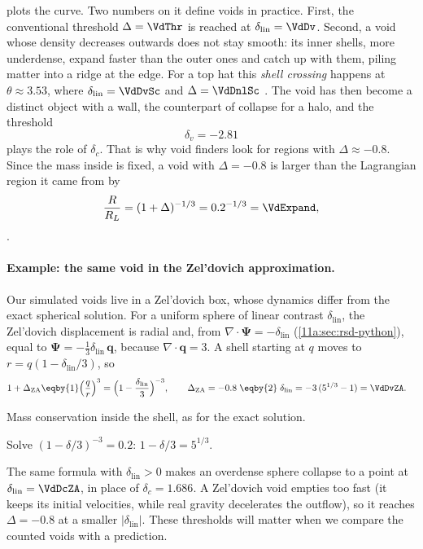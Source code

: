  plots the curve. Two numbers on it define voids in
practice. First, the conventional threshold $\Delta=\VdThr$ is reached at
$\delta_{\mathrm{lin}}=\VdDv$. Second, a void whose density decreases outwards does
not stay smooth: its inner shells, more underdense, expand faster than the outer
ones and catch up with them, piling matter into a ridge at the edge. For a top hat
this \emph{shell crossing} happens at $\theta\approx3.53$, where
$\delta_{\mathrm{lin}}=\VdDvSc$ and $\Delta=\VdDnlSc$
. The void has then become a distinct object
with a wall, the counterpart of collapse for a halo, and the threshold
\begin{equation}
  \delta_v=-2.81
  \label{11b:eq:deltav}
\end{equation}
plays the role of $\delta_c$. That is why void finders look for regions with
$\Delta\approx-0.8$. Since the mass inside is fixed, a void with $\Delta=-0.8$ is
larger than the Lagrangian region it came from by
\begin{equation}
  \frac{R}{R_L}=(1+\Delta)^{-1/3}=0.2^{-1/3}=\VdExpand ,
  \label{11b:eq:void-expand}
\end{equation}
.

\paragraph{Example: the same void in the Zel'dovich approximation.}
Our simulated voids live in a Zel'dovich box, whose dynamics differ from the exact
spherical solution. For a uniform sphere of linear contrast $\delta_{\mathrm{lin}}$,
the Zel'dovich displacement is radial and, from $\nabla\cdot\bm\Psi=-\delta_{\mathrm{lin}}$
(\cref{11a:sec:rsd-python}), equal to $\bm\Psi=-\tfrac13\delta_{\mathrm{lin}}\,\bm q$,
because $\nabla\cdot\bm q=3$. A shell starting at $q$ moves to
$r=q(1-\delta_{\mathrm{lin}}/3)$, so
\begin{align}
  1+\Delta_{\mathrm{ZA}}
  &\eqby{1}\Bigl(\frac qr\Bigr)^3
   =\Bigl(1-\frac{\delta_{\mathrm{lin}}}{3}\Bigr)^{-3},
  \qquad
  \Delta_{\mathrm{ZA}}=-0.8
  \;\eqby{2}\;\delta_{\mathrm{lin}}=-3\,(5^{1/3}-1)=\VdDvZA .
  \label{11b:eq:za-void}
\end{align}
\begin{explain}
  \item Mass conservation inside the shell, as for the exact solution.
  \item Solve $(1-\delta/3)^{-3}=0.2$: $1-\delta/3=5^{1/3}$.
\end{explain}
The same formula with $\delta_{\mathrm{lin}}>0$ makes an overdense sphere collapse
to a point at $\delta_{\mathrm{lin}}=\VdDcZA$, in place of $\delta_c=1.686$. A
Zel'dovich void empties too fast (it keeps its initial velocities, while real
gravity decelerates the outflow), so it reaches $\Delta=-0.8$ at a smaller
$|\delta_{\mathrm{lin}}|$. These thresholds will matter when we compare the counted
voids with a prediction.

